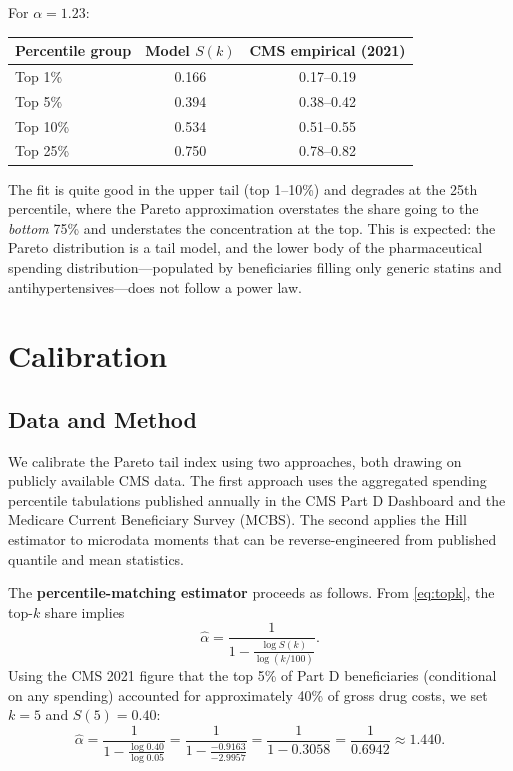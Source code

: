 \documentclass[12pt,letterpaper]{article}
\begin{document}
\noindent For $\alpha = 1.23$:
\begin{center}
\begin{tabular}{lcc}
\hline
Percentile group & Model $S(k)$ & CMS empirical (2021) \\
\hline
Top 1\%   & 0.166 & 0.17--0.19 \\
Top 5\%   & 0.394 & 0.38--0.42 \\
Top 10\%  & 0.534 & 0.51--0.55 \\
Top 25\%  & 0.750 & 0.78--0.82 \\
\hline
\end{tabular}
\end{center}

The fit is quite good in the upper tail (top 1--10\%) and degrades at the
25th percentile, where the Pareto approximation overstates the share going to
the \emph{bottom} 75\% and understates the concentration at the top.  This is
expected: the Pareto distribution is a tail model, and the lower body of the
pharmaceutical spending distribution---populated by beneficiaries filling only
generic statins and antihypertensives---does not follow a power law.

\section{Calibration}\label{sec:calibration}

\subsection{Data and Method}

We calibrate the Pareto tail index using two approaches, both drawing on
publicly available CMS data. The first approach uses the aggregated spending
percentile tabulations published annually in the CMS Part D Dashboard and the
Medicare Current Beneficiary Survey (MCBS). The second applies the Hill
estimator to microdata moments that can be reverse-engineered from published
quantile and mean statistics.

The \textbf{percentile-matching estimator} proceeds as follows. From
\eqref{eq:topk}, the top-$k$ share implies
\begin{equation}\label{eq:alpha_hat}
  \hat{\alpha} = \frac{1}{1 - \frac{\log S(k)}{\log(k/100)}}.
\end{equation}
Using the CMS 2021 figure that the top 5\% of Part D beneficiaries
(conditional on any spending) accounted for approximately 40\% of gross
drug costs, we set $k = 5$ and $S(5) = 0.40$:
\[
  \hat{\alpha} = \frac{1}{1 - \frac{\log 0.40}{\log 0.05}}
  = \frac{1}{1 - \frac{-0.9163}{-2.9957}}
  = \frac{1}{1 - 0.3058}
  = \frac{1}{0.6942}
  \approx 1.440.
\]
\end{document}
